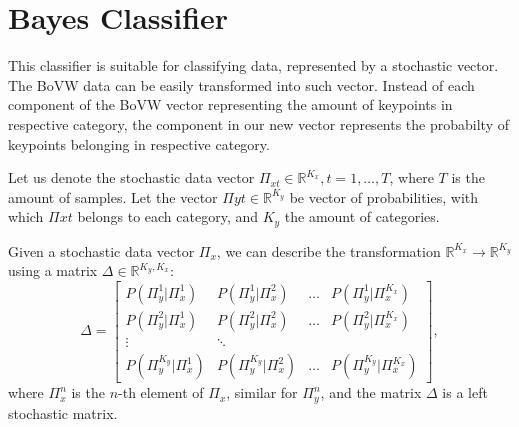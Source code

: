 \section{Bayes Classifier}
This classifier is suitable for classifying data, represented by a stochastic vector. The BoVW data can be easily transformed into such vector. Instead of each component of the BoVW vector representing the amount of keypoints in respective category, the component in our new vector represents the probabilty of keypoints belonging in respective category.

Let us denote the stochastic data vector $\Pi_{xt} \in \mathbb{R}^{K_x}, t=1,\dots,T$, where $T$ is the amount of samples. Let the vector $\Pi{yt}\in \mathbb{R}^{K_y}$ be vector of probabilities, with which $\Pi{xt}$ belongs to each category, and $K_y$ the amount of categories.

Given a stochastic data vector $\Pi_x$, we can describe the transformation $\mathbb{R}^{K_x} \rightarrow \mathbb{R}^{K_y}$ using a matrix $\Delta \in \mathbb{R}^{K_y, K_x}$:
\begin{equation}
    \Delta =
    \begin{bmatrix}
        P(\Pi_y^1 | \Pi_x^1) & P(\Pi_y^1 | \Pi_x^2) & \dots & P(\Pi_y^1 | \Pi_x^{K_x})\\
        P(\Pi_y^2 | \Pi_x^1) & P(\Pi_y^2 | \Pi_x^2) & \dots & P(\Pi_y^2 | \Pi_x^{K_x})\\
        \vdots & \ddots\\
        P(\Pi_y^{K_y} | \Pi_x^1) & P(\Pi_y^{K_y} | \Pi_x^2) & \dots & P(\Pi_y^{K_y} | \Pi_x^{K_x})
    \end{bmatrix},
\end{equation}
where $\Pi_x^n$ is the $n$-th element of $\Pi_x$, similar for $\Pi_y^n$, and the matrix $\Delta$ is a left stochastic matrix.

